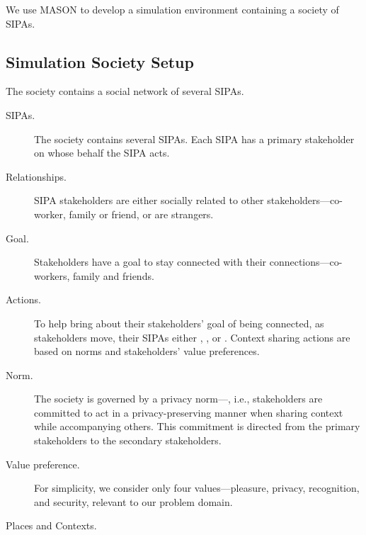 We use MASON \citep{Luke-2005-Mason} to develop a simulation environment containing a society of \locationapp SIPAs. 

\subsection{Simulation Society Setup}
\label{sec:simulation-setup}

The society contains a social network of several SIPAs. 

\begin{description}

\item[SIPAs.] The society contains several SIPAs. Each SIPA has a primary stakeholder on whose behalf the SIPA acts.  

\item[Relationships.] SIPA stakeholders are either socially related to other stakeholders---co-worker, family or friend, or are strangers. 

\item[Goal.] Stakeholders have a goal to stay connected with their connections---co-workers, family and friends. 


\item[Actions.] To help bring about their stakeholders' goal of being connected, as stakeholders move, their SIPAs either , , or . Context sharing actions are based on norms and stakeholders' value preferences.

\item[Norm.] The society is governed by a privacy norm---, i.e., stakeholders are committed to act in a privacy-preserving manner when sharing context while accompanying others. This commitment is directed from the primary stakeholders to the secondary stakeholders.  

\item[Value preference.] For simplicity, we consider only four values---pleasure, privacy, recognition, and security, relevant to our problem domain.  

\item[Places and Contexts.]


\end{description}
